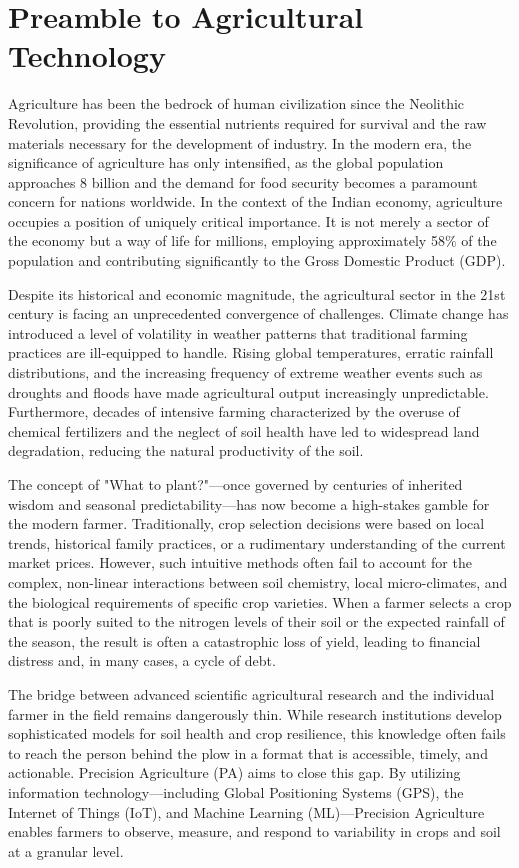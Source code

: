 \documentclass[12pt,a4paper]{report}
\begin{document}
\section{Preamble to Agricultural Technology}
\label{sec:1.1}
Agriculture has been the bedrock of human civilization since the Neolithic Revolution, providing the essential nutrients required for survival and the raw materials necessary for the development of industry. In the modern era, the significance of agriculture has only intensified, as the global population approaches 8 billion and the demand for food security becomes a paramount concern for nations worldwide. In the context of the Indian economy, agriculture occupies a position of uniquely critical importance. It is not merely a sector of the economy but a way of life for millions, employing approximately 58\% of the population and contributing significantly to the Gross Domestic Product (GDP).

Despite its historical and economic magnitude, the agricultural sector in the 21st century is facing an unprecedented convergence of challenges. Climate change has introduced a level of volatility in weather patterns that traditional farming practices are ill-equipped to handle. Rising global temperatures, erratic rainfall distributions, and the increasing frequency of extreme weather events such as droughts and floods have made agricultural output increasingly unpredictable. Furthermore, decades of intensive farming characterized by the overuse of chemical fertilizers and the neglect of soil health have led to widespread land degradation, reducing the natural productivity of the soil.

The concept of "What to plant?"—once governed by centuries of inherited wisdom and seasonal predictability—has now become a high-stakes gamble for the modern farmer. Traditionally, crop selection decisions were based on local trends, historical family practices, or a rudimentary understanding of the current market prices. However, such intuitive methods often fail to account for the complex, non-linear interactions between soil chemistry, local micro-climates, and the biological requirements of specific crop varieties. When a farmer selects a crop that is poorly suited to the nitrogen levels of their soil or the expected rainfall of the season, the result is often a catastrophic loss of yield, leading to financial distress and, in many cases, a cycle of debt.

The bridge between advanced scientific agricultural research and the individual farmer in the field remains dangerously thin. While research institutions develop sophisticated models for soil health and crop resilience, this knowledge often fails to reach the person behind the plow in a format that is accessible, timely, and actionable. Precision Agriculture (PA) aims to close this gap. By utilizing information technology—including Global Positioning Systems (GPS), the Internet of Things (IoT), and Machine Learning (ML)—Precision Agriculture enables farmers to observe, measure, and respond to variability in crops and soil at a granular level. 
\end{document}
